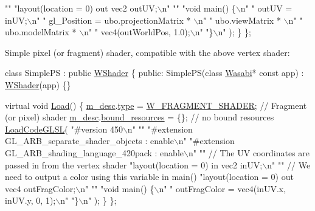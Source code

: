 \begin{DoxyCode}
            \textcolor{stringliteral}{""}
            \textcolor{stringliteral}{"layout(location = 0) out vec2 outUV;\(\backslash\)n"}
            \textcolor{stringliteral}{""}
            \textcolor{stringliteral}{"void main() \{\(\backslash\)n"}
            \textcolor{stringliteral}{"   outUV = inUV;\(\backslash\)n"}
            \textcolor{stringliteral}{"   gl\_Position = ubo.projectionMatrix * \(\backslash\)n"}
            \textcolor{stringliteral}{"               ubo.viewMatrix * \(\backslash\)n"}
            \textcolor{stringliteral}{"               ubo.modelMatrix * \(\backslash\)n"}
            \textcolor{stringliteral}{"               vec4(outWorldPos, 1.0);\(\backslash\)n"}
            \textcolor{stringliteral}{"\}\(\backslash\)n"}
        );
    \}
\};
\end{DoxyCode}


Simple pixel (or fragment) shader, compatible with the above vertex shader\+: 
\begin{DoxyCode}
\textcolor{keyword}{class }SimplePS : \textcolor{keyword}{public} \hyperlink{class_w_shader}{WShader} \{
\textcolor{keyword}{public}:
    SimplePS(\textcolor{keyword}{class} \hyperlink{class_wasabi}{Wasabi}* \textcolor{keyword}{const} app) : \hyperlink{class_w_shader}{WShader}(app) \{\}

    \textcolor{keyword}{virtual} \textcolor{keywordtype}{void} \hyperlink{class_w_shader_a7ce478193bc1676b1a7fdd741bdb32aa}{Load}() \{
        \hyperlink{class_w_shader_a887bf7b5a672bcc901eb8999713d8cfe}{m\_desc}.\hyperlink{struct_w___s_h_a_d_e_r___d_e_s_c_ad7b83db0ce3b5eb747a0fea76b52acd5}{type} = \hyperlink{group__engineclass_gga8a79e4a3a441c88450e176150102c7b7aff8fd7a9b753adb4f08ef1568b31cc88}{W\_FRAGMENT\_SHADER}; \textcolor{comment}{// Fragment (or pixel) shader}
        \hyperlink{class_w_shader_a887bf7b5a672bcc901eb8999713d8cfe}{m\_desc}.\hyperlink{struct_w___s_h_a_d_e_r___d_e_s_c_aa3fea1cc775493c0fe9590129f91df63}{bound\_resources} = \{\}; \textcolor{comment}{// no bound resources}
        \hyperlink{class_w_shader_a29cffc471a569bbd669969feed3245d5}{LoadCodeGLSL}(
            \textcolor{stringliteral}{"#version 450\(\backslash\)n"}
            \textcolor{stringliteral}{""}
            \textcolor{stringliteral}{"#extension GL\_ARB\_separate\_shader\_objects : enable\(\backslash\)n"}
            \textcolor{stringliteral}{"#extension GL\_ARB\_shading\_language\_420pack : enable\(\backslash\)n"}
            \textcolor{stringliteral}{""} \textcolor{comment}{// The UV coordinates are passed in from the vertex shader}
            \textcolor{stringliteral}{"layout(location = 0) in vec2 inUV;\(\backslash\)n"}
            \textcolor{stringliteral}{""} \textcolor{comment}{// We need to output a color using this variable in main()}
            \textcolor{stringliteral}{"layout(location = 0) out vec4 outFragColor;\(\backslash\)n"}
            \textcolor{stringliteral}{""}
            \textcolor{stringliteral}{"void main() \{\(\backslash\)n"}
            \textcolor{stringliteral}{"       outFragColor = vec4(inUV.x, inUV.y, 0, 1);\(\backslash\)n"}
            \textcolor{stringliteral}{"\}\(\backslash\)n"}
        );
    \}
\};
\end{DoxyCode}


